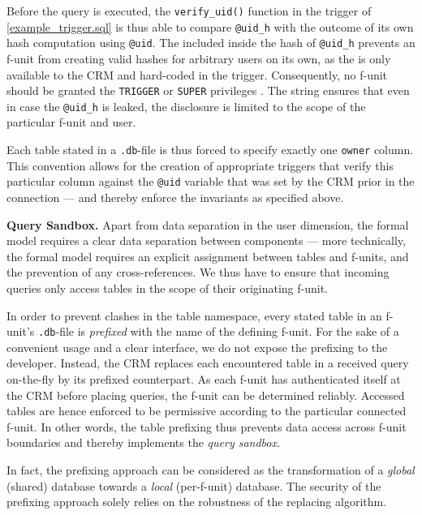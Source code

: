 \documentclass{src/acm_proc_article-sp} \else
\newcommand\myparagraph[1]{\medskip\noindent\textbf{#1.}}
\begin{document}
Before the query is executed, the \texttt{verify\_uid()} function in
the trigger of \autoref{example_trigger.sql} is thus able to compare
\texttt{@uid\_h} with the outcome of its own hash computation using
\texttt{@uid}. The included  inside the hash of
\texttt{@uid\_h} prevents an f-unit from creating valid hashes for
arbitrary users on its own, as the  is only available to
the CRM and hard-coded in the trigger. Consequently, no f-unit should
be granted the \texttt{TRIGGER} or \texttt{SUPER} privileges
\cite{mysql-show-triggers}. The  string ensures that
even in case the \texttt{@uid\_h} is leaked, the disclosure is
limited to the scope of the particular f-unit and user.

Each table stated in a \texttt{.db}-file is thus forced to specify
exactly one \texttt{owner} column. This convention allows for the
creation of appropriate triggers that verify this particular column
against the \texttt{@uid} variable that was set by the CRM prior in
the connection --- and thereby enforce the invariants as specified
above.

\myparagraph{Query Sandbox}
Apart from data separation in the user dimension, the formal model
requires a clear data separation between components --- more
technically, the formal model requires an explicit assignment between
tables and f-units, and the prevention of any cross-references. We
thus have to ensure that incoming queries only access tables in the
scope of their originating f-unit.

In order to prevent clashes in the table namespace, every stated
table in an f-unit's \texttt{.db}-file is \emph{prefixed} with the
name of the defining f-unit. For the sake of a convenient usage and a
clear interface, we do not expose the prefixing to the developer.
Instead, the CRM replaces each encountered table in a received query
on-the-fly by its prefixed counterpart. As each f-unit has
authenticated itself at the CRM before placing queries, the f-unit
can be determined reliably. Accessed tables are hence enforced to be
permissive according to the particular connected f-unit. In other
words, the table prefixing thus prevents data access across f-unit
boundaries and thereby implements the \emph{query sandbox}.

In fact, the prefixing approach can be considered as the
transformation of a \emph{global} (shared) database towards a
\emph{local} (per-f-unit) database. The security of the prefixing
approach solely relies on the robustness of the replacing algorithm.
\end{document}

